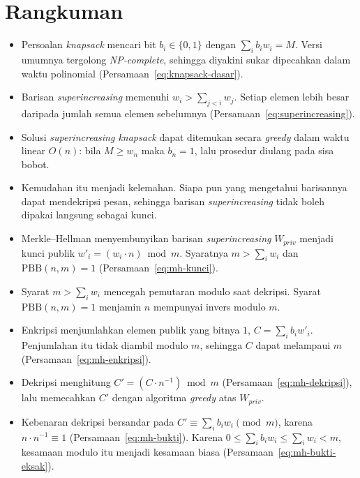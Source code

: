 \section{Rangkuman}
\begin{itemize}
    \item Persoalan \textit{knapsack} mencari bit $b_i \in \{0,1\}$ dengan
          $\sum_i b_i w_i = M$. Versi umumnya tergolong \textit{NP-complete},
          sehingga diyakini sukar dipecahkan dalam waktu polinomial
          (Persamaan~\eqref{eq:knapsack-dasar}).
    \item Barisan \textit{superincreasing} memenuhi
          $w_i > \sum_{j<i} w_j$. Setiap elemen lebih besar daripada jumlah
          semua elemen sebelumnya (Persamaan~\eqref{eq:superincreasing}).
    \item Solusi \textit{superincreasing knapsack} dapat ditemukan secara
          \textit{greedy} dalam waktu linear $O(n)$: bila $M \ge w_n$ maka
          $b_n = 1$, lalu prosedur diulang pada sisa bobot.
    \item Kemudahan itu menjadi kelemahan. Siapa pun yang mengetahui barisannya
          dapat mendekripsi pesan, sehingga barisan \textit{superincreasing}
          tidak boleh dipakai langsung sebagai kunci.
    \item Merkle--Hellman menyembunyikan barisan \textit{superincreasing}
          $W_{priv}$ menjadi kunci publik
          $w'_i = (w_i \cdot n) \bmod m$. Syaratnya $m > \sum_i w_i$ dan
          $\text{PBB}(n,m)=1$ (Persamaan~\eqref{eq:mh-kunci}).
    \item Syarat $m > \sum_i w_i$ mencegah pemutaran modulo saat dekripsi.
          Syarat $\text{PBB}(n,m)=1$ menjamin $n$ mempunyai invers modulo $m$.
    \item Enkripsi menjumlahkan elemen publik yang bitnya $1$,
          $C = \sum_i b_i w'_i$. Penjumlahan itu tidak diambil modulo $m$,
          sehingga $C$ dapat melampaui $m$ (Persamaan~\eqref{eq:mh-enkripsi}).
    \item Dekripsi menghitung $C' = (C \cdot n^{-1}) \bmod m$
          (Persamaan~\eqref{eq:mh-dekripsi}), lalu memecahkan $C'$ dengan
          algoritma \textit{greedy} atas $W_{priv}$.
    \item Kebenaran dekripsi bersandar pada
          $C' \equiv \sum_i b_i w_i \pmod m$, karena
          $n \cdot n^{-1} \equiv 1$ (Persamaan~\eqref{eq:mh-bukti}). Karena
          $0 \le \sum_i b_i w_i \le \sum_i w_i < m$, kesamaan modulo itu menjadi
          kesamaan biasa (Persamaan~\eqref{eq:mh-bukti-eksak}).

\end{itemize}
